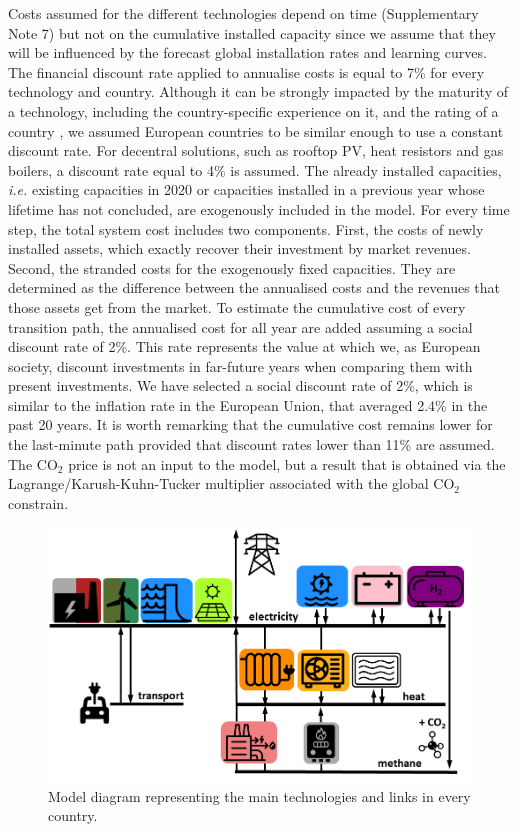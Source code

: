 \documentclass[5p]{elsarticle} %
\begin{document}
Costs assumed for the different technologies depend on time (Supplementary Note 7) but not on the cumulative installed capacity since we assume that they will be influenced by the forecast global installation rates and learning curves. The financial discount rate applied to annualise costs is equal to 7\% for every technology and country. Although it can be strongly impacted by the maturity of a technology, including the country-specific experience on it, and the rating of a country \cite{Egli_2019}, we assumed European countries to be similar enough to use a constant discount rate. For decentral solutions, such as rooftop PV, heat resistors and gas boilers, a discount rate equal to 4\% is assumed. The already installed capacities, \textit{i.e.} existing capacities in 2020 or capacities installed in a previous year whose lifetime has not concluded, are exogenously included in the model. For every time step, the total system cost includes two components. First, the costs of newly installed assets, which exactly recover their investment by market revenues. Second, the stranded costs for the exogenously fixed capacities. They are determined as the difference between the annualised costs and the revenues that those assets get from the market.  To estimate the cumulative cost of every transition path, the annualised cost for all year are added assuming a social discount rate of 2\%. This rate represents the value at which we, as European society, discount investments in far-future years when comparing them with present investments. We have selected a social discount rate of 2\%, which is similar to the inflation rate in the European Union, that averaged 2.4\% in the past 20 years. \textcolor[rgb]{1,0,0}{It is worth remarking that the cumulative cost remains lower for the last-minute path provided that discount rates lower than 11\% are assumed}. The CO$_2$ price is not an input to the model, but a result that is obtained via the Lagrange/Karush-Kuhn-Tucker multiplier associated with the global CO$_2$ constrain. 
\begin{figure}[!h]
\centering
\includegraphics[width=\columnwidth]{figures/model.png}
\caption{Model diagram representing the main technologies and links in every country.} \label{fig_model} 
\end{figure}
\end{document}
